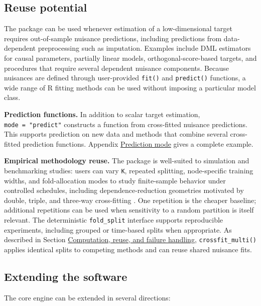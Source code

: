 \subsection{Reuse potential}\label{reuse-potential}

The package can be used whenever estimation of a low-dimensional target requires out-of-sample nuisance predictions, including predictions from data-dependent preprocessing such as imputation. Examples include DML estimators for causal parameters, partially linear models, orthogonal-score-based targets, and procedures that require several dependent nuisance components. Because nuisances are defined through user-provided \texttt{fit()} and \texttt{predict()} functions, a wide range of R fitting methods can be used without imposing a particular model class.

\textbf{Prediction functions.} In addition to scalar target estimation, \texttt{mode\ =\ "predict"} constructs a function from cross-fitted nuisance predictions. This supports prediction on new data and methods that combine several cross-fitted prediction functions. Appendix \hyperref[app:predict]{Prediction mode} gives a complete example.

\textbf{Empirical methodology reuse.} The package is well-suited to simulation and benchmarking studies: users can vary \texttt{K}, repeated splitting, node-specific training widths, and fold-allocation modes to study finite-sample behavior under controlled schedules, including dependence-reduction geometries motivated by double, triple, and three-way cross-fitting \citep{mcclean2024, fisher2023, ke2024, chiang2022}. One repetition is the cheaper baseline; additional repetitions can be used when sensitivity to a random partition is itself relevant. The deterministic \texttt{fold\_split} interface supports reproducible experiments, including grouped or time-based splits when appropriate. As described in Section \hyperref[subsec:performance]{Computation, reuse, and failure handling}, \texttt{crossfit\_multi()} applies identical splits to competing methods and can reuse shared nuisance fits.

\subsection{Extending the software}\label{extending-the-software}

The core engine can be extended in several directions:

